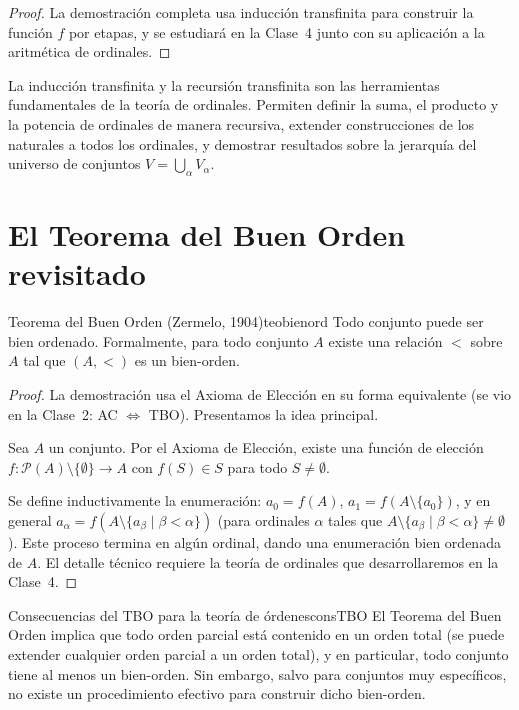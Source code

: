 \begin{proof}
La demostración completa usa inducción transfinita para construir la función $f$ por etapas, y se estudiará en la Clase~4 junto con su aplicación a la aritmética de ordinales.
\end{proof}

\begin{importante}
La inducción transfinita y la recursión transfinita son las herramientas fundamentales de la teoría de ordinales. Permiten definir la suma, el producto y la potencia de ordinales de manera recursiva, extender construcciones de los naturales a todos los ordinales, y demostrar resultados sobre la jerarquía del universo de conjuntos $V = \bigcup_{\alpha} V_\alpha$.
\end{importante}

\section{El Teorema del Buen Orden revisitado}

\begin{teorema}{Teorema del Buen Orden (Zermelo, 1904)}{teobienord}
Todo conjunto puede ser bien ordenado. Formalmente, para todo conjunto $A$ existe una relación $<$ sobre $A$ tal que $(A, <)$ es un bien-orden.
\end{teorema}

\begin{proof}
La demostración usa el Axioma de Elección en su forma equivalente (se vio en la Clase~2: AC $\iff$ TBO). Presentamos la idea principal.

Sea $A$ un conjunto. Por el Axioma de Elección, existe una función de elección $f: \mathcal{P}(A) \setminus \{\emptyset\} \to A$ con $f(S) \in S$ para todo $S \neq \emptyset$.

Se define inductivamente la enumeración: $a_0 = f(A)$, $a_1 = f(A \setminus \{a_0\})$, y en general $a_\alpha = f(A \setminus \{a_\beta \mid \beta < \alpha\})$ (para ordinales $\alpha$ tales que $A \setminus \{a_\beta \mid \beta < \alpha\} \neq \emptyset$). Este proceso termina en algún ordinal, dando una enumeración bien ordenada de $A$. El detalle técnico requiere la teoría de ordinales que desarrollaremos en la Clase~4.
\end{proof}

\begin{observacion}{Consecuencias del TBO para la teoría de órdenes}{consTBO}
El Teorema del Buen Orden implica que todo orden parcial está contenido en un orden total (se puede extender cualquier orden parcial a un orden total), y en particular, todo conjunto tiene al menos un bien-orden. Sin embargo, salvo para conjuntos muy específicos, no existe un procedimiento efectivo para construir dicho bien-orden.
\end{observacion}

